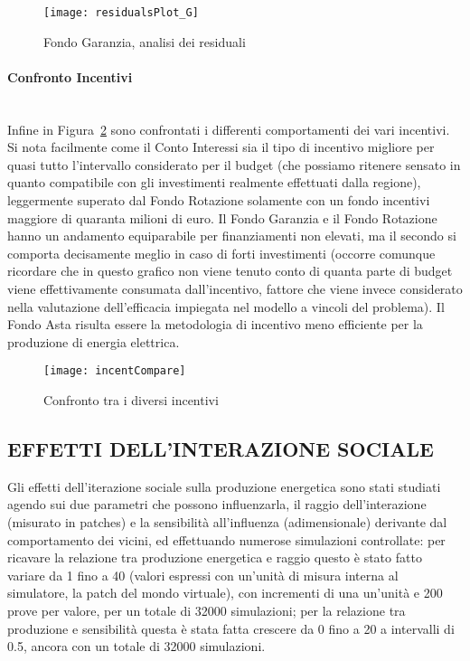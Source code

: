 \documentclass[12pt,a4paper,openright,twoside]{report}
\newcommand{\myparagraph}[1]{\paragraph{#1}\mbox{}\\}
\begin{document}
\begin{figure}[hbt]
	\centering
	\texttt{[image: residualsPlot\_G]}
	\caption{Fondo Garanzia, analisi dei residuali}
	\label{residualsPlot_G}
\end{figure}

\myparagraph{Confronto Incentivi}

Infine in Figura~\ref{incentCompare} sono confrontati i differenti comportamenti dei vari incentivi. Si nota facilmente come il Conto Interessi sia il tipo di incentivo migliore per quasi tutto l'intervallo considerato per il budget (che possiamo ritenere sensato in quanto compatibile con gli investimenti realmente effettuati dalla regione), leggermente superato dal Fondo Rotazione solamente con un fondo incentivi maggiore di quaranta milioni di euro. Il Fondo Garanzia e il Fondo Rotazione hanno un andamento equiparabile per finanziamenti non elevati, ma il secondo si comporta decisamente meglio in caso di forti investimenti (occorre comunque ricordare che in questo grafico non viene tenuto conto di quanta parte di budget viene effettivamente consumata dall'incentivo, fattore che viene invece considerato nella valutazione dell'efficacia impiegata nel modello a vincoli del problema). Il Fondo Asta risulta essere la metodologia di incentivo meno efficiente per la produzione di energia elettrica.

\begin{figure}[hbt]
	\centering
	\texttt{[image: incentCompare]}
	\caption{Confronto tra i diversi incentivi}
	\label{incentCompare}
\end{figure}

\subsection{EFFETTI DELL'INTERAZIONE SOCIALE}

Gli effetti dell'iterazione sociale sulla produzione energetica sono stati studiati agendo sui due parametri che possono influenzarla, il raggio dell'interazione (misurato in patches) e la sensibilità all'influenza (adimensionale) derivante dal comportamento dei vicini, ed effettuando numerose simulazioni controllate: per ricavare la relazione tra produzione energetica e raggio questo è stato fatto variare da 1 fino a 40 (valori espressi con un'unità di misura interna al simulatore, la patch del mondo virtuale), con incrementi di una un'unità e 200 prove per valore, per un totale di 32000 simulazioni; per la relazione tra produzione e sensibilità questa è stata fatta crescere da 0 fino a 20 a intervalli di 0.5, ancora con un totale di 32000 simulazioni.
\end{document}
